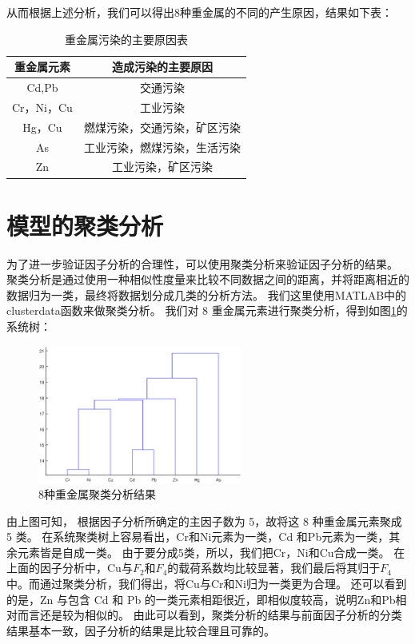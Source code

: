 \documentclass[a4paper]{article}
\begin{document}
\indent 从而根据上述分析，我们可以得出8种重金属的不同的产生原因，结果如下表：
\begin{table}[H]
		\centering
		\caption{重金属污染的主要原因表}
		\label{main-reason}
		\begin{tabular}{|c|c|}
		\hline
			重金属元素	  &  造成污染的主要原因 \\
			\hline
			Cd,Pb  &    交通污染  \\  \hline
			Cr，Ni，Cu  &    工业污染 \\ \hline
			Hg，Cu   &   燃煤污染，交通污染，矿区污染 \\ \hline
			As   &	工业污染，燃煤污染，生活污染  \\ \hline
			Zn  &     工业污染，矿区污染        \\ \hline
		\end{tabular}
\end{table}
\section{模型的聚类分析}
为了进一步验证因子分析的合理性，可以使用聚类分析来验证因子分析的结果。
聚类分析是通过使用一种相似性度量来比较不同数据之间的距离，并将距离相近的数据归为一类，最终将数据划分成几类的分析方法。
我们这里使用MATLAB中的clusterdata函数来做聚类分析。
我们对 8 重金属元素进行聚类分析，得到如图\ref{fig:cluster}的系统树：
\begin{figure}
    \includegraphics[width=0.6\textwidth,bb=80 420 500 720]{pictures/cluster.eps}
    \caption{8种重金属聚类分析结果}
    \label{fig:cluster}
\end{figure}
由上图可知， 根据因子分析所确定的主因子数为 5，故将这 8 种重金属元素聚成 5 类。
在系统聚类树上容易看出，Cr和Ni元素为一类，Cd 和Pb元素为一类，其余元素皆是自成一类。
由于要分成5类，所以，我们把Cr，Ni和Cu合成一类。
在上面的因子分析中，Cu与$F_2$和$F_4$的载荷系数均比较显著，我们最后将其归于$F_4$中。而通过聚类分析，我们得出，将Cu与Cr和Ni归为一类更为合理。
还可以看到的是，Zn 与包含 Cd 和 Pb 的一类元素相距很近，即相似度较高，说明Zn和Pb相对而言还是较为相似的。
由此可以看到，聚类分析的结果与前面因子分析的分类结果基本一致，因子分析的结果是比较合理且可靠的。
\end{document}
